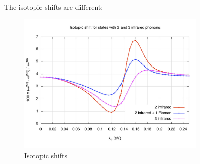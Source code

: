 The isotopic shifts are different:

\begin{figure}[ht!]
\centering
\includegraphics[width=0.8\textwidth]{images/isot-2_3ir.jpg}
\caption{Isotopic shifts}
\label{fig:isot-2_3ir}
\end{figure}
